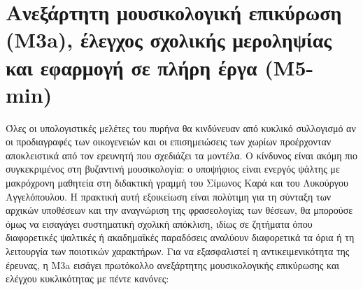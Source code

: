 \documentclass[11pt,a4paper]{article}
\begin{document}
\section{Ανεξάρτητη μουσικολογική επικύρωση (Μ3a), έλεγχος σχολικής μεροληψίας και εφαρμογή σε πλήρη έργα (Μ5-min)}

Όλες οι υπολογιστικές μελέτες του πυρήνα θα κινδύνευαν από κυκλικό συλλογισμό αν οι προδιαγραφές των οικογενειών και οι επισημειώσεις των χωρίων προέρχονταν αποκλειστικά από τον ερευνητή που σχεδιάζει τα μοντέλα. Ο κίνδυνος είναι ακόμη πιο συγκεκριμένος στη βυζαντινή μουσικολογία: ο υποψήφιος είναι ενεργός ψάλτης με μακρόχρονη μαθητεία στη διδακτική γραμμή του Σίμωνος Καρά και του Λυκούργου Αγγελόπουλου. Η πρακτική αυτή εξοικείωση είναι πολύτιμη για τη σύνταξη των αρχικών υποθέσεων και την αναγνώριση της φρασεολογίας των θέσεων, θα μπορούσε όμως να εισαγάγει συστηματική σχολική απόκλιση, ιδίως σε ζητήματα όπου διαφορετικές ψαλτικές ή ακαδημαϊκές παραδόσεις αναλύουν διαφορετικά τα όρια ή τη λειτουργία των ποιοτικών χαρακτήρων. Για να εξασφαλιστεί η αντικειμενικότητα της έρευνας, η Μ3a εισάγει πρωτόκολλο ανεξάρτητης μουσικολογικής επικύρωσης και ελέγχου κυκλικότητας με πέντε κανόνες:
\end{document}
